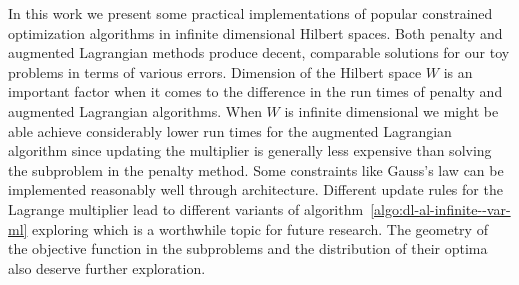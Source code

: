 In this work we present some practical implementations of popular constrained optimization algorithms in infinite dimensional Hilbert spaces. Both penalty and augmented Lagrangian methods produce decent, comparable solutions for our toy problems in terms of various errors. Dimension of the Hilbert space $W$ is an important factor when it comes to the difference in the run times of penalty and augmented Lagrangian algorithms. When $W$ is infinite dimensional we might be able achieve considerably lower run times for the augmented Lagrangian algorithm since updating the multiplier is generally less expensive than solving the subproblem in the penalty method. Some constraints like Gauss's law can be implemented reasonably well through architecture. Different update rules for the Lagrange multiplier lead to different variants of algorithm~\ref{algo:dl-al-infinite--var-ml} exploring which is a worthwhile topic for future research. The geometry of the objective function in the subproblems and the distribution of their optima also deserve further exploration.     
